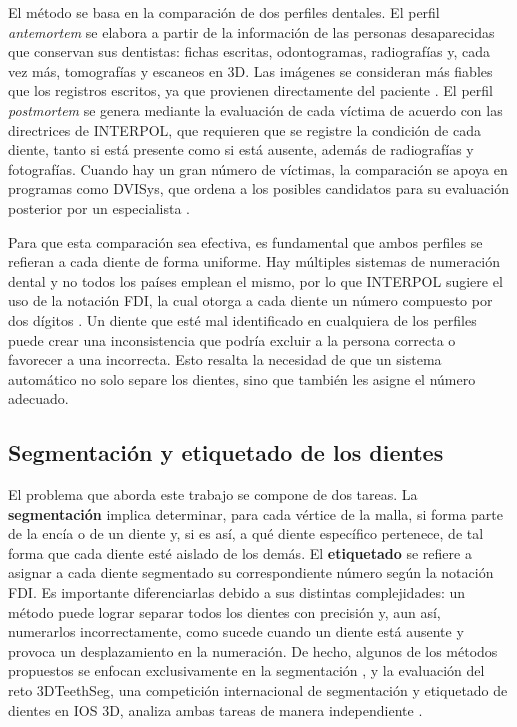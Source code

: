 El método se basa en la comparación de dos perfiles dentales. El perfil \textit{antemortem} se elabora a partir de la información de las personas desaparecidas que conservan sus dentistas: fichas escritas, odontogramas, radiografías y, cada vez más, tomografías y escaneos en 3D. Las imágenes se consideran más fiables que los registros escritos, ya que provienen directamente del paciente \cite{forrestForensicOdontologyDVI2019}. El perfil \textit{postmortem} se genera mediante la evaluación de cada víctima de acuerdo con las directrices de INTERPOL, que requieren que se registre la condición de cada diente, tanto si está presente como si está ausente, además de radiografías y fotografías. Cuando hay un gran número de víctimas, la comparación se apoya en programas como DVISys, que ordena a los posibles candidatos para su evaluación posterior por un especialista \cite{forrestForensicOdontologyDVI2019}.

Para que esta comparación sea efectiva, es fundamental que ambos perfiles se refieran a cada diente de forma uniforme. Hay múltiples sistemas de numeración dental y no todos los países emplean el mismo, por lo que INTERPOL sugiere el uso de la notación FDI, la cual otorga a cada diente un número compuesto por dos dígitos \cite{forrestForensicOdontologyDVI2019}. Un diente que esté mal identificado en cualquiera de los perfiles puede crear una inconsistencia que podría excluir a la persona correcta o favorecer a una incorrecta. Esto resalta la necesidad de que un sistema automático no solo separe los dientes, sino que también les asigne el número adecuado.

\subsection{Segmentación y etiquetado de los dientes}
\label{subsec:segmentacion-etiquetado}

El problema que aborda este trabajo se compone de dos tareas. La \textbf{segmentación} implica determinar, para cada vértice de la malla, si forma parte de la encía o de un diente y, si es así, a qué diente específico pertenece, de tal forma que cada diente esté aislado de los demás. El \textbf{etiquetado} se refiere a asignar a cada diente segmentado su correspondiente número según la notación FDI. Es importante diferenciarlas debido a sus distintas complejidades: un método puede lograr separar todos los dientes con precisión y, aun así, numerarlos incorrectamente, como sucede cuando un diente está ausente y provoca un desplazamiento en la numeración. De hecho, algunos de los métodos propuestos se enfocan exclusivamente en la segmentación \cite{qiuDArchDentalArch2022}, y la evaluación del reto 3DTeethSeg, una competición internacional de segmentación y etiquetado de dientes en IOS 3D, analiza ambas tareas de manera independiente \cite{ben-hamadou3DTeethSeg223DTeeth2023}.

